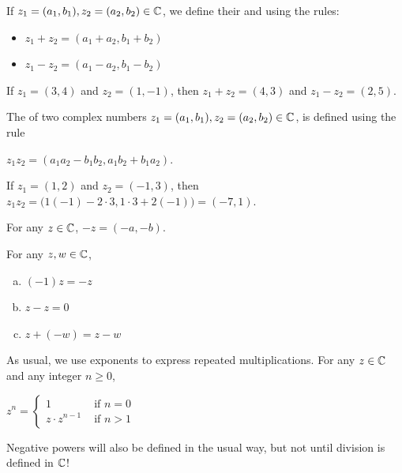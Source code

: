 \documentclass[11pt,fleqn,dvipsnames,usenames]{article}
\begin{document}
\begin{definition}
If $z_{1} = (a_{1},b_{1}), z_{2} = (a_{2},b_{2})\in\mathbb{C}$, we define their  and  using the rules:
\begin{itemize}
\item $z_{1} + z_{2} = (a_{1} + a_{2}, b_{1} + b_{2})$
\item $z_{1} - z_{2} = (a_{1} - a_{2}, b_{1} - b_{2})$
\end{itemize}
\end{definition}

\begin{example}
If $z_{1} = (3,4)$ and $z_{2} = (1,-1)$, then $z_{1} + z_{2} = (4, 3)$ and $z_{1} - z_{2} = (2,5)$.
\end{example}

\begin{definition}\label{complexmultiplication}
The  of two complex numbers $z_{1} = (a_{1},b_{1}), z_{2} = (a_{2},b_{2})\in\mathbb{C}$, is defined using the rule
\begin{center}
$z_{1}z_{2} = (a_{1}a_{2} - b_{1}b_{2}, a_{1}b_{2} + b_{1}a_{2})$.
\end{center}
\end{definition}

\begin{example}\label{examplecomplexmultiplication}
If $z_{1} = (1,2)$ and $z_{2} = (-1,3)$, then $z_{1}z_{2} = \Big(1(-1) - 2\cdot 3, 1\cdot 3 + 2(-1)\Big) = (-7,1)$.
\end{example}

\notation For any $z\in\mathbb{C}$, $-z = (-a,-b)$.
\vsp

\properties For any $z,w\in\mathbb{C}$,
\begin{enumerate}[(a)]
\item $(-1)z = -z$
\item $z - z = 0$
\item $z + (-w) = z - w$
\end{enumerate}
\vsp

\notation As usual, we use exponents to express repeated multiplications.  For any $z\in\mathbb{C}$ and any integer $n\geq 0$,
\begin{center}
$z^{n} = \begin{cases} 1 & \text{ if }n = 0\\z\cdot z^{n-1} &\text{ if }n > 1\end{cases}$
\end{center}

\note Negative powers will also be defined in the usual way, but not until division is defined in $\mathbb{C}$!
\end{document}

